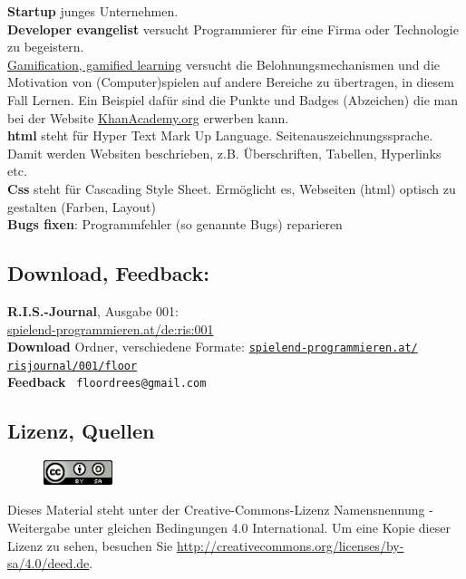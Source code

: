 \textbf{Startup} junges Unternehmen. \\

\textbf{Developer evangelist} versucht Programmierer für eine Firma oder Technologie zu begeistern. \\

\href{https://de.wikipedia.org/wiki/Gamification}{Gamification, gamified learning} versucht die Belohnungsmechanismen und die Motivation von (Computer)spielen auf andere Bereiche zu übertragen, in diesem Fall Lernen. Ein Beispiel dafür sind die Punkte und Badges (Abzeichen) die man bei der Website \href{http://khanacademy.org}{KhanAcademy.org} erwerben kann. \\
 
\textbf{html} steht für Hyper Text Mark Up Language. Seitenauszeichnungssprache. Damit werden Websiten beschrieben, z.B. Überschriften, Tabellen, Hyperlinks etc. \\

\textbf{Css} steht für Cascading Style Sheet. Ermöglicht es, Webseiten (html) optisch zu gestalten (Farben, Layout) \\

\textbf{Bugs fixen}: Programmfehler (so genannte Bugs) reparieren \\


\subsection*{Download, Feedback:}
\textbf{R.I.S.-Journal}, Ausgabe 001: \\
\href{http://spielend-programmieren.at/de:ris:001}{spielend-programmieren.at/de:ris:001}\\
\textbf{Download} Ordner, verschiedene Formate: \href{http://spielend-programmieren.at/risjournal/001/floor}{\texttt{spielend-programmieren.at/\\risjournal/001/floor}} \\
\textbf{Feedback} \Letter\ \texttt{floordrees@gmail.com} \\

\subsection*{Lizenz, Quellen}

\begin{figure}
\includegraphics[width=2cm]{floor/ccbysa88x31.png}
\end{figure}
Dieses Material steht unter der Creative-Commons-Lizenz Namensnennung - Weitergabe unter gleichen Bedingungen 4.0 International. Um eine Kopie dieser Lizenz zu sehen, besuchen Sie \url{http://creativecommons.org/licenses/by-sa/4.0/deed.de}.

